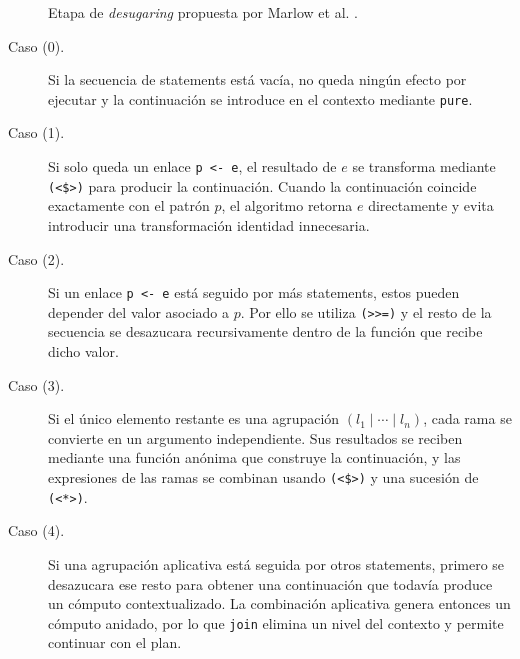 \begin{figure}[ht]
\begin{minipage}{0.6\textwidth}
  \AdoBlockGap
  \end{minipage}
  \endgroup
  \captionsetup{skip=14pt}
  \caption{Etapa de \textit{desugaring} propuesta por Marlow et al. \cite[p.~96]{MarlowPJKM2016}.}
  \label{fig:desugaring-marlow}
\end{figure}

\begin{description}
  \item[Caso (0).] Si la secuencia de statements está vacía, no queda ningún efecto por ejecutar y la continuación se introduce en el contexto mediante \texttt{pure}.

  \item[Caso (1).] Si solo queda un enlace \verb|p <- e|, el resultado de $e$ se transforma mediante \verb|(<$>)| para producir la continuación. Cuando la continuación coincide exactamente con el patrón $p$, el algoritmo retorna $e$ directamente y evita introducir una transformación identidad innecesaria.

  \item[Caso (2).] Si un enlace \verb|p <- e| está seguido por más statements, estos pueden depender del valor asociado a $p$. Por ello se utiliza \verb|(>>=)| y el resto de la secuencia se desazucara recursivamente dentro de la función que recibe dicho valor.

  \item[Caso (3).] Si el único elemento restante es una agrupación $(l_1\mid\cdots\mid l_n)$, cada rama se convierte en un argumento independiente. Sus resultados se reciben mediante una función anónima que construye la continuación, y las expresiones de las ramas se combinan usando \verb|(<$>)| y una sucesión de \verb|(<*>)|.

  \item[Caso (4).] Si una agrupación aplicativa está seguida por otros statements, primero se desazucara ese resto para obtener una continuación que todavía produce un cómputo contextualizado. La combinación aplicativa genera entonces un cómputo anidado, por lo que \texttt{join} elimina un nivel del contexto y permite continuar con el plan.
\end{description}

